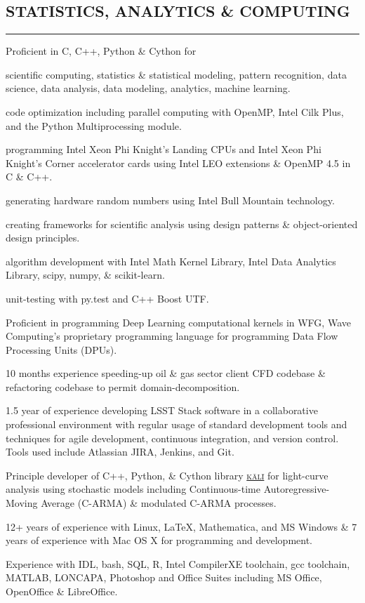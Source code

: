 \documentclass[10pt,a4]{article}
\newcounter{myEnumCounter}
\newcounter{mySaveCounter}
\renewenvironment{enumerate}{%
  \begin{list}{\arabic{myEnumCounter}.}{\usecounter{myEnumCounter}%
  \setcounter{myEnumCounter}{\value{mySaveCounter}}}
  }{%
  \setcounter{mySaveCounter}{\value{myEnumCounter}}\end{list}%
}
\newcommand\myEnumReset{\setcounter{mySaveCounter}{0}}
\begin{document}
\subsection*{STATISTICS, ANALYTICS \& COMPUTING}
\hrule  height 4pt
\vspace{0.2cm}
\begin{itemize}
\item Proficient in C, C++, Python \& Cython for
	\begin{enumerate}
		\item scientific computing, statistics \& statistical modeling, pattern recognition, data science, data analysis, data modeling, analytics, machine learning.
		\item code optimization including parallel computing with OpenMP, Intel Cilk Plus, and the Python Multiprocessing module.
		\item programming Intel Xeon Phi Knight's Landing CPUs and Intel Xeon Phi Knight's Corner accelerator cards using Intel LEO extensions \& OpenMP 4.5 in C \& C++.
		\item generating hardware random numbers using Intel Bull Mountain technology.
    \item creating frameworks for scientific analysis using design patterns \& object-oriented design principles.
    \item algorithm development with Intel Math Kernel Library, Intel Data Analytics Library, scipy, numpy, \& scikit-learn.
    \item unit-testing with py.test and C++ Boost UTF.
	\end{enumerate}
\item Proficient in programming Deep Learning computational kernels in WFG, Wave Computing's proprietary programming language for programming Data Flow Processing Units (DPUs).
\item 10 months experience speeding-up oil \& gas sector client CFD codebase \& refactoring codebase to permit domain-decomposition.
\item 1.5 year of experience developing LSST Stack software in a collaborative professional environment with regular usage of standard development tools and techniques for agile development, continuous integration, and version control. Tools used include Atlassian JIRA, Jenkins, and Git.
\item Principle developer of C++, Python, \& Cython library \href{https://github.com/AstroVPK/kali}{\textsc{k\={a}l\={i}}} for light-curve analysis using stochastic models including Continuous-time Autoregressive-Moving Average (C-ARMA) \& modulated C-ARMA processes.
\item 12+ years of experience with Linux, \LaTeX, Mathematica, and MS Windows \& 7 years of experience with Mac OS X for programming and development.
\item Experience with IDL, bash, SQL, R, Intel CompilerXE toolchain, gcc toolchain, MATLAB, LONCAPA, Photoshop and Office Suites including MS Office, OpenOffice \& LibreOffice.
\end{itemize}
\myEnumReset
\end{document}
